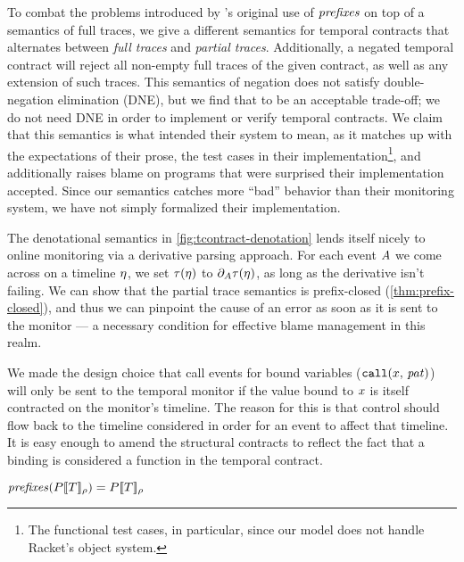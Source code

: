 %
To combat the problems introduced by \dfm's original use of $\mathit{prefixes}$ on top of a semantics of full traces, we give a different semantics for temporal contracts that alternates between \emph{full traces} and \emph{partial traces}.
%
Additionally, a negated temporal contract will reject all non-empty full traces of the given contract, as well as any extension of such traces.
%
This semantics of negation does not satisfy double-negation elimination (DNE), but we find that to be an acceptable trade-off; we do not need DNE in order to implement or verify temporal contracts.
%
We claim that this semantics is what \dfm{} intended their system to mean, as it matches up with the expectations of their prose, the test cases in their implementation\footnote{The functional test cases, in particular, since our model does not handle Racket's object system.}, and additionally raises blame on programs that \dfm{} were surprised their implementation accepted.
%
Since our semantics catches more ``bad'' behavior than their monitoring system, we have not simply formalized their implementation.

The denotational semantics in \autoref{fig:tcontract-denotation} lends itself nicely to online monitoring via a derivative parsing approach.
%
For each event $A$ we come across on a timeline $\eta$, we set $\tau(\eta)$ to $\partial_{A}{\tau(\eta)}$, as long as the derivative isn't failing.
%
We can show that the partial trace semantics is prefix-closed (\autoref{thm:prefix-closed}), and thus we can pinpoint the cause of an error as soon as it is sent to the monitor --- a necessary condition for effective blame management in this realm.

We made the design choice that call events for bound variables (${\tt call}(x,\, \mathit{pat})$) will only be sent to the temporal monitor if the value bound to $x$ is itself contracted on the monitor's timeline.
%
The reason for this is that control should flow back to the timeline considered in order for an event to affect that timeline.
%
It is easy enough to amend the structural contracts to reflect the fact that a binding is considered a function in the temporal contract.

\begin{theorem}\label{thm:prefix-closed}
  $\mathit{prefixes}(P[\![ T ]\!]_{\rho}) = P[\![ T ]\!]_{\rho}$
\end{theorem}

